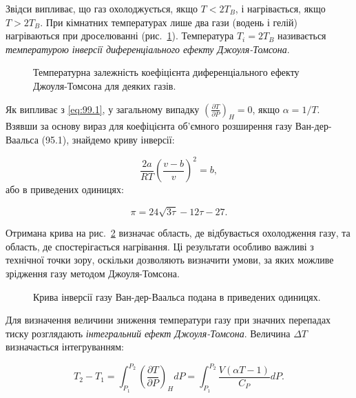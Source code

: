 Звідси випливає, що газ охолоджується, якщо $T < 2T_B$, і нагрівається, якщо $T > 2T_B$. При кімнатних
температурах лише два гази (водень і гелій) нагріваються при дроселюванні (рис.~\ref{pic:8.12}). Температура $T_i = 2T_B$
називається \emph{температурою інверсії диференціального ефекту Джоуля-Томсона}.

\begin{figure}[h!]\centering

\caption{Температурна залежність коефіцієнта диференціального ефекту Джоуля-Томсона для деяких газів.}
\label{pic:8.12}
\end{figure}

Як випливає з \eqref{eq:99.1}, у загальному випадку $\left(\frac{\partial T}{\partial P}\right)_H =
0$, якщо $\alpha = 1/T$. Взявши за основу вираз для коефіцієнта об'ємного розширення газу
Ван-дер-Ваальса (95.1), знайдемо криву інверсії:

\begin{equation}
\frac{2a}{RT}\left(\frac{v - b}{v}\right)^2 = b,
\label{eq:99.3}
\end{equation}
%
або в приведених одиницях:

\begin{equation}
\pi = 24\sqrt{3\tau} - 12\tau - 27.
\label{eq:99.4}
\end{equation}

Отримана крива на рис.~\ref{pic:8.13} визначає область, де відбувається охолодження газу, та область, де спостерігається
нагрівання. Ці результати особливо важливі з технічної точки зору, оскільки дозволяють визначити
умови, за яких можливе зрідження газу методом Джоуля-Томсона.

\begin{figure}[h!]\centering

\caption{Крива інверсії газу Ван-дер-Ваальса подана в приведених одиницях.}
\label{pic:8.13}
\end{figure}

Для визначення величини зниження температури газу при значних перепадах тиску розглядають
\emph{інтегральний ефект Джоуля-Томсона}. Величина $\Delta T$ визначається інтегруванням:

\begin{equation}
T_2 - T_1 = \int_{P_1}^{P_2} \left(\frac{\partial T}{\partial P}\right)_H dP = \int_{P_1}^{P_2}
\frac{V(\alpha T - 1)}{C_P} dP.
\label{eq:99.5}
\end{equation}

